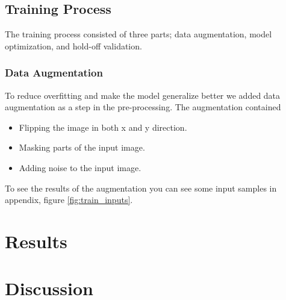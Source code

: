 \documentclass[fleqn,10pt]{SelfArx} %
\begin{document}
\subsection{Training Process}
The training process consisted of three parts; data augmentation, model optimization, and hold-off validation.
\subsubsection{Data Augmentation}
To reduce overfitting and make the model generalize better we added data augmentation as a step in the pre-processing. The augmentation contained
\begin{itemize}
    \item Flipping the image in both x and y direction.
    \item Masking parts of the input image.
    \item Adding noise to the input image.
\end{itemize}
To see the results of the augmentation you can see some input samples in appendix, figure \ref{fig:train_inputs}. 
\section{Results}

\section{Discussion}
\end{document}

